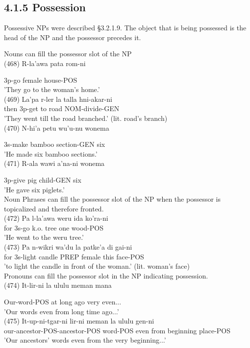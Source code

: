 \documentclass[10pt]{article}
\begin{document}
\subsection*{4.1.5 Possession}
Possessive NPs were described §3.2.1.9. The object that is being possessed is the head of the NP and the possessor precedes it.

Nouns can fill the possessor slot of the NP\\
(468) R-la'awa pata rom-ni

3p-go female house-POS\\
'They go to the woman's home.'\\
(469) La'pa r-ler la talla hni-akar-ni\\
then 3p-get to road NOM-divide-GEN\\
'They went till the road branched.' (lit. road's branch)\\
(470) N-hi'a petu wu'u-nu wonema

3s-make bamboo section-GEN six\\
'He made six bamboo sections.'\\
(471) R-ala wawi a'na-ni wonema

3p-give pig child-GEN six\\
'He gave six piglets.'\\
Noun Phrases can fill the possessor slot of the NP when the possessor is topicalized and therefore fronted.\\
(472) Pa l-la'awa weru ida ko'ra-ni\\
for 3s-go k.o. tree one wood-POS\\
'He went to the weru tree.'\\
(473) Pa n-wikri wa'du la patke'a di gai-ni\\
for 3s-light candle PREP female this face-POS\\
'to light the candle in front of the woman.' (lit. woman's face)\\
Pronouns can fill the possessor slot in the NP indicating possession.\\
(474) It-lir-ni la ululu meman mana

Our-word-POS at long ago very even...\\
'Our words even from long time ago...'\\
(475) It-up-ni-tgar-ni lir-ni meman la ululu gen-ni\\
our-ancestor-POS-ancestor-POS word-POS even from beginning place-POS\\
'Our ancestors' words even from the very beginning...'
\end{document}
